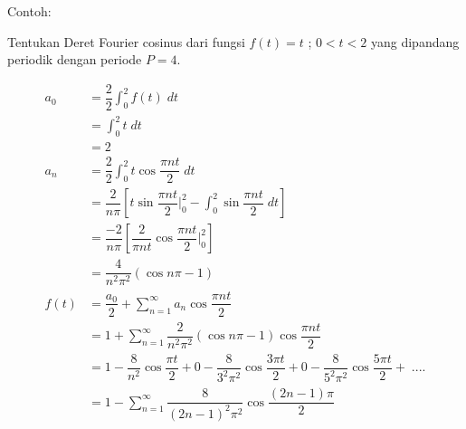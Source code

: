 \documentclass{article}
\begin{document}
Contoh:

Tentukan Deret Fourier cosinus dari fungsi $f(t)=t$ ; $0<t<2$ yang dipandang periodik dengan periode $P=4$.

\begin{align}
    a_0  & = \dfrac{2}{2} \int_{0}^{2} f(t) \;dt
    \nonumber                                                                                                                                                       \\
         & = \int_{0}^{2} t \;dt
    \nonumber                                                                                                                                                       \\
         & = 2
    \nonumber                                                                                                                                                       \\
    a_n  & = \dfrac{2}{2} \int_{0}^{2} t \cos \dfrac{\pi nt}{2} \;dt
    \nonumber                                                                                                                                                       \\
         & = \dfrac{2}{n \pi} [t \sin \dfrac{\pi nt}{2}|_0^2 - \int_{0}^{2} \sin \dfrac{\pi nt}{2} \; dt]
    \nonumber                                                                                                                                                       \\
         & = \dfrac{-2}{n \pi} [\dfrac{2}{\pi nt} \cos \dfrac{\pi nt}{2}|_0^2]
    \nonumber                                                                                                                                                       \\
         & = \dfrac{4}{n^2 \pi^2} (\cos n \pi - 1)
    \nonumber                                                                                                                                                       \\
    f(t) & = \dfrac{a_0}{2} + \sum_{n = 1}^{\infty} a_n \cos \dfrac{\pi nt}{2}
    \nonumber                                                                                                                                                       \\
         & = 1 + \sum_{n = 1}^{\infty} \dfrac{2}{n^2 \pi^2} (\cos n\pi - 1) \cos \dfrac{\pi nt}{2}
    \nonumber                                                                                                                                                       \\
         & = 1 - \dfrac{8}{n^2} \cos \dfrac{\pi t}{2} + 0 - \dfrac{8}{3^2 \pi^2} \cos \dfrac{3\pi t}{2} + 0 - \dfrac{8}{5^2 \pi^2} \cos \dfrac{5\pi t}{2} + \; ....
    \nonumber                                                                                                                                                       \\
         & = 1 - \sum_{n = 1}^{\infty} \dfrac{8}{(2n - 1)^2 \pi^2} \cos \dfrac{(2n - 1) \pi}{2}
    \nonumber
\end{align}
\end{document}
